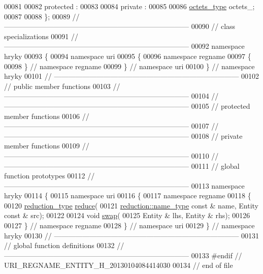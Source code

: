 \begin{DoxyCode}
00081 
00082 \textcolor{keyword}{protected} :
00083 
00084 \textcolor{keyword}{private} :
00085 
00086     \hyperlink{classhryky_1_1_vector}{octets_type} octets\_;
00087 
00088 \};
00089 \textcolor{comment}{//
      ------------------------------------------------------------------------------}
00090 \textcolor{comment}{// class specializations}
00091 \textcolor{comment}{//
      ------------------------------------------------------------------------------}
00092 \textcolor{keyword}{namespace }hryky
00093 \{
00094 \textcolor{keyword}{namespace }uri
00095 \{
00096 \textcolor{keyword}{namespace }regname
00097 \{
00098 \} \textcolor{comment}{// namespace regname}
00099 \} \textcolor{comment}{// namespace uri}
00100 \} \textcolor{comment}{// namespace hryky}
00101 \textcolor{comment}{//
      ------------------------------------------------------------------------------}
00102 \textcolor{comment}{// public member functions}
00103 \textcolor{comment}{//
      ------------------------------------------------------------------------------}
00104 \textcolor{comment}{//
      ------------------------------------------------------------------------------}
00105 \textcolor{comment}{// protected member functions}
00106 \textcolor{comment}{//
      ------------------------------------------------------------------------------}
00107 \textcolor{comment}{//
      ------------------------------------------------------------------------------}
00108 \textcolor{comment}{// private member functions}
00109 \textcolor{comment}{//
      ------------------------------------------------------------------------------}
00110 \textcolor{comment}{//
      ------------------------------------------------------------------------------}
00111 \textcolor{comment}{// global function prototypes}
00112 \textcolor{comment}{//
      ------------------------------------------------------------------------------}
00113 \textcolor{keyword}{namespace }hryky
00114 \{
00115 \textcolor{keyword}{namespace }uri
00116 \{
00117 \textcolor{keyword}{namespace }regname
00118 \{
00120     \hyperlink{namespacehryky_a343a9a4c36a586be5c2693156200eadc}{reduction_type} \hyperlink{namespacehryky_1_1uri_ab4530b241565d82fb0768bb29031858f}{reduce}(
00121         \hyperlink{namespacehryky_1_1reduction_ac686c30a4c8d196bbd0f05629a6b921f}{reduction::name_type} \textcolor{keyword}{const} & name, Entity \textcolor{keyword}{const} & src);
00122 
00124     \textcolor{keywordtype}{void} \hyperlink{namespacehryky_1_1uri_a385681623309ce37d502b7efea1bf924}{swap}(
00125         Entity & lhs, Entity & rhs);
00126 
00127 \} \textcolor{comment}{// namespace regname}
00128 \} \textcolor{comment}{// namespace uri}
00129 \} \textcolor{comment}{// namespace hryky}
00130 \textcolor{comment}{//
      ------------------------------------------------------------------------------}
00131 \textcolor{comment}{// global function definitions}
00132 \textcolor{comment}{//
      ------------------------------------------------------------------------------}
00133 \textcolor{preprocessor}{#endif // URI\_REGNAME\_ENTITY\_H\_20130104084414030}
00134 \textcolor{preprocessor}{}\textcolor{comment}{// end of file}
\end{DoxyCode}
